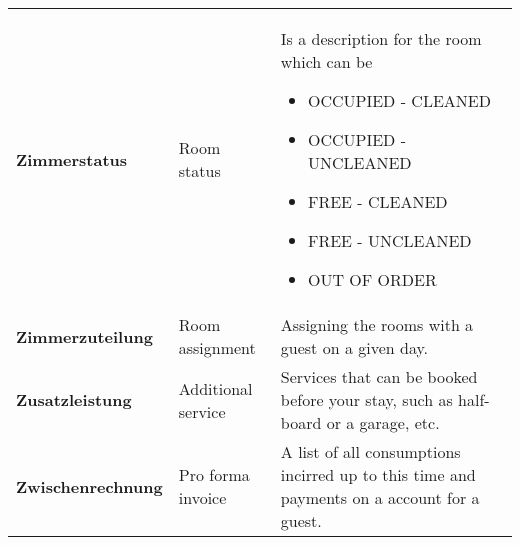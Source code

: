 \documentclass[../Pflichtenheft.tex]{subfiles}
\begin{document}
\begin{longtable}{p{4cm} p{4cm} p{6cm}}
        \textbf{Zimmerstatus} & {Room status} & Is a description for the room which can be \begin{itemize}
                                                                                               \item OCCUPIED - CLEANED
                                                                                               \item OCCUPIED - UNCLEANED
                                                                                               \item FREE - CLEANED
                                                                                               \item FREE - UNCLEANED
                                                                                               \item OUT OF ORDER
        \end{itemize} \\[0.5cm]
		\textbf{Zimmerzuteilung} & {Room assignment} & Assigning the rooms with a guest on a given day. \\[0.5cm]
        \textbf{Zusatzleistung} & {Additional service} & Services that can be booked before your stay, such as half-board or a garage, etc. \\[0.5cm]
        \textbf{Zwischenrechnung} & {Pro forma invoice} & A list of all consumptions incirred up to this time and payments on a account for a guest. \\[0.5cm]
	\end{longtable}
\end{document}
